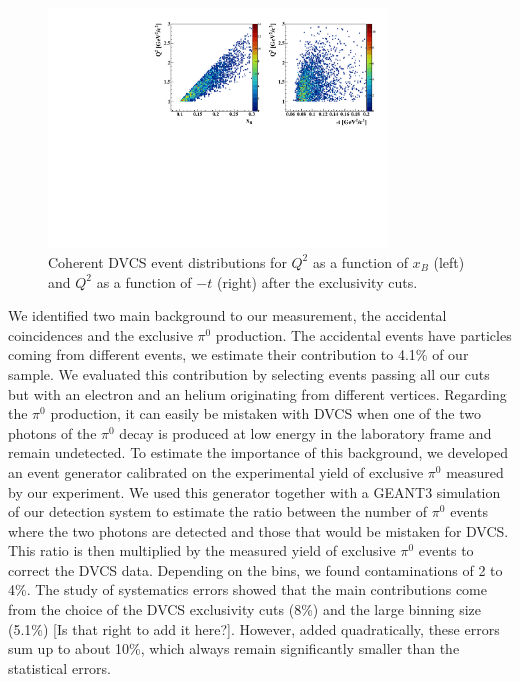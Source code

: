 \documentclass[nofootinbib,twocolumn,showpacs,prl,superscriptaddress,secnumarabic,amssymb,nobibnotes,aps,floatfix,preprint]{revtex4}
\begin{document}
\begin{figure}[tb]
\hspace{-0.45cm}
\includegraphics[width=9.0cm]{figs/Q2_xB_t_Coh.pdf}
\caption{Coherent DVCS event distributions for $Q^{2}$ as a function of 
$x_{B}$ (left) and $Q^{2}$ as a function of $-t$ (right) after the 
exclusivity cuts.}
\label{fig:kin-coverage}
\end{figure}

We identified two main background to our measurement, the accidental 
coincidences and the exclusive $\pi^0$ production. The accidental events have 
particles coming from different events, we estimate their  contribution
to 4.1\% of our sample. We evaluated this contribution by selecting events 
passing all our cuts but with an electron and an helium originating from different 
vertices. Regarding the $\pi^0$ production, it can easily be mistaken with DVCS when 
one of the two photons of the $\pi^0$ decay is produced at low energy in the 
laboratory frame and remain undetected. To estimate the importance of this 
background, we developed an event generator calibrated on the experimental yield 
of exclusive $\pi^0$ measured by our experiment. We used this generator together 
with a GEANT3 simulation of our detection system to estimate the ratio between
the number of $\pi^0$ events where the two photons are detected and those that 
would be mistaken for DVCS. This ratio is then multiplied by the measured yield 
of exclusive $\pi^0$ events to correct the DVCS data. Depending on the bins, we
found contaminations of 2 to 4\%. The study of systematics errors showed that the main 
contributions come from the choice of the DVCS exclusivity cuts (8\%) and the 
large binning size (5.1\%) [Is that right to add it here?]. However, added quadratically, these 
errors sum up to about 10\%, which always remain significantly smaller than the 
statistical errors.
\end{document}
